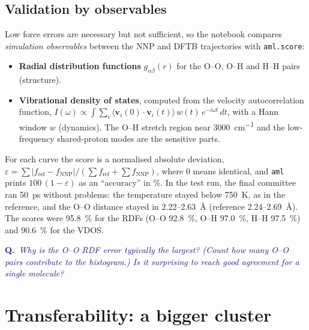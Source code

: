 \documentclass[11pt,a4paper]{article}
\newcommand{\question}[1]{\par\smallskip\noindent\textcolor{MidnightBlue}{\textbf{Q.}~\emph{#1}}\par\smallskip}
\begin{document}
\subsection{Validation by observables}
Low force errors are necessary but not sufficient, so the notebook compares
\emph{simulation observables} between the NNP and DFTB trajectories with
\texttt{aml.score}:
\begin{itemize}
  \item \textbf{Radial distribution functions} $g_{\alpha\beta}(r)$ for the
        O--O, O--H and H--H pairs (structure).
  \item \textbf{Vibrational density of states}, computed from the velocity
        autocorrelation function,
        $I(\omega)\propto\int \sum_i\langle\mathbf v_i(0)\cdot\mathbf v_i(t)\rangle
        \,w(t)\,e^{-i\omega t}\,dt$, with a Hann window $w$ (dynamics).
        The O--H stretch region near \SI{3000}{cm^{-1}} and the low-frequency
        shared-proton modes are the sensitive parts.
\end{itemize}
For each curve the score is a normalised absolute deviation,
$\varepsilon = \sum|f_{\mathrm{ref}}-f_{\mathrm{NNP}}| /
\left(\sum f_{\mathrm{ref}}+\sum f_{\mathrm{NNP}}\right)$, where 0 means
identical, and \texttt{aml} prints $100\,(1-\varepsilon)$ as an
``accuracy'' in \%. In the test run, the final committee ran \SI{50}{ps}
without problems: the temperature stayed below \SI{750}{K}, as in the
reference, and the O--O distance stayed in 2.22--\SI{2.63}{\angstrom}
(reference 2.24--\SI{2.69}{\angstrom}). The scores were \SI{95.8}{\%} for
the RDFs (O--O \SI{92.8}{\%}, O--H \SI{97.0}{\%}, H--H \SI{97.5}{\%}) and
\SI{90.6}{\%} for the VDOS.

\question{Why is the O--O RDF error typically the largest? (Count how many O--O
pairs contribute to the histogram.) Is it surprising to reach good agreement
for a single molecule?}

\section{Transferability: a bigger cluster}
\label{sec:transfer}
\end{document}

